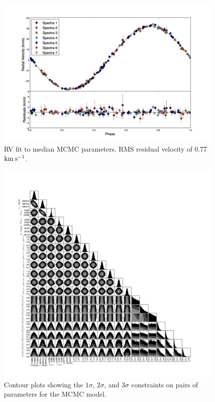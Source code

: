 \documentclass{article}
\begin{document}
\begin{figure}[!htb]
\centering
\includegraphics[width=\textwidth]{RVfit_100000_gammas.jpg}
\caption{RV fit to median MCMC parameters. RMS residual velocity of 0.77$\rm{km \: s^{-1}}$.}
\end{figure}

\begin{figure}[!htb]
\centering
\includegraphics[width=\textwidth]{corner_100000_gammas.jpg}
\caption{Contour plots showing the $1 \sigma$, $2 \sigma$, and $3 \sigma$ constraints on pairs of parameters for the MCMC model.}
\end{figure}
\end{document}
